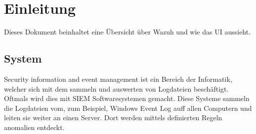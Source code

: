 \chapter{Einleitung}
Dieses Dokument beinhaltet eine Übersicht über Wazuh und wie das UI aussieht. 

\section{ System}
Security information and event management ist ein Bereich der Informatik, welcher sich mit dem sammeln und auswerten von Logdateien beschäftigt.
Oftmals wird dies mit SIEM Softwaresystemen gemacht.
Diese Systeme sammeln die Logdateien vom, zum Beispiel, Windows Event Log auff allen Computern und leiten sie weiter an einen Server.
Dort werden mittels definierten Regeln anomalien entdeckt.
